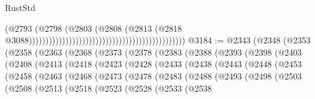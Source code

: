 \begin{lexlean}{RustStd}
\begin{coremodule}
                                                                                      (@2793
                                                                                        (@2798
                                                                                          (@2803
                                                                                            (@2808
                                                                                              (@2813
                                                                                                (@2818
                                                                                                  @3088)))))))))))))))))))))))))))))))))))))))))))))))
@3184 := @2343
    (@2348
      (@2353
        (@2358
          (@2363
            (@2368
              (@2373
                (@2378
                  (@2383
                    (@2388
                      (@2393
                        (@2398
                          (@2403
                            (@2408
                              (@2413
                                (@2418
                                  (@2423
                                    (@2428
                                      (@2433
                                        (@2438
                                          (@2443
                                            (@2448
                                              (@2453
                                                (@2458
                                                  (@2463
                                                    (@2468
                                                      (@2473
                                                        (@2478
                                                          (@2483
                                                            (@2488
                                                              (@2493
                                                                (@2498
                                                                  (@2503
                                                                    (@2508
                                                                      (@2513
                                                                        (@2518
                                                                          (@2523
                                                                            (@2528
                                                                              (@2533
                                                                                (@2538

\end{coremodule}
\end{lexlean}
